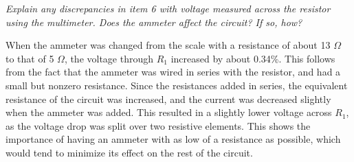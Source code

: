 \documentclass[twocolumn,english]{IEEEtran}
\theoremstyle{plain}
\theoremstyle{plain}
\begin{document}
\textit{Explain any discrepancies in item 6 with voltage measured across the resistor using the multimeter. Does the ammeter affect the circuit? If so, how?}

When the ammeter was changed from the scale with a resistance of about 13 $\Omega$ to that of 5 $\Omega$, the voltage through $R_1$ increased by about 0.34\%. This follows from the fact that the ammeter was wired in series with the resistor, and had a small but nonzero resistance. Since the resistances added in series, the equivalent resistance of the circuit was increased, and the current was decreased slightly when the ammeter was added. This resulted in a slightly lower voltage across $R_1$, as the voltage drop was split over two resistive elements. This shows the importance of having an ammeter with as low of a resistance as possible, which would tend to minimize its effect on the rest of the circuit.
\end{document}
